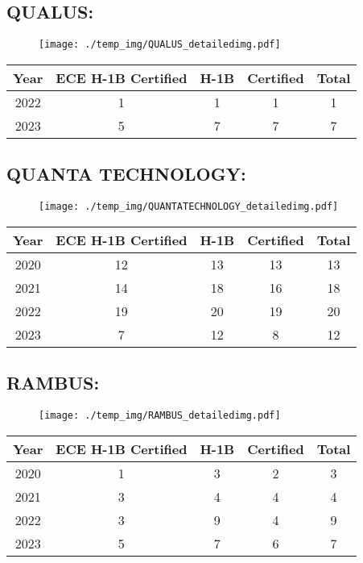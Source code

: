 \documentclass{article}%
\begin{document}
%
\newpage%
\subsection{QUALUS:}%
\label{subsec:QUALUS}%
\label{QUALUSdetailed}%


\begin{figure}[htbp]%
\centering%
\texttt{[image: ./temp\_img/QUALUS\_detailedimg.pdf]}%
\end{figure}

%
\begin{longtable}{c|c|c|c|c}%
\hline%
Year&ECE H{-}1B Certified&H{-}1B&Certified&Total\\%
\hline%
2022&1&1&1&1\\%
\hline%
2023&5&7&7&7\\%
\hline%
\end{longtable}

%
\newpage%
\subsection{QUANTA TECHNOLOGY:}%
\label{subsec:QUANTATECHNOLOGY}%
\label{QUANTATECHNOLOGYdetailed}%


\begin{figure}[htbp]%
\centering%
\texttt{[image: ./temp\_img/QUANTATECHNOLOGY\_detailedimg.pdf]}%
\end{figure}

%
\begin{longtable}{c|c|c|c|c}%
\hline%
Year&ECE H{-}1B Certified&H{-}1B&Certified&Total\\%
\hline%
2020&12&13&13&13\\%
\hline%
2021&14&18&16&18\\%
\hline%
2022&19&20&19&20\\%
\hline%
2023&7&12&8&12\\%
\hline%
\end{longtable}

%
\newpage%
\subsection{RAMBUS:}%
\label{subsec:RAMBUS}%
\label{RAMBUSdetailed}%


\begin{figure}[htbp]%
\centering%
\texttt{[image: ./temp\_img/RAMBUS\_detailedimg.pdf]}%
\end{figure}

%
\begin{longtable}{c|c|c|c|c}%
\hline%
Year&ECE H{-}1B Certified&H{-}1B&Certified&Total\\%
\hline%
2020&1&3&2&3\\%
\hline%
2021&3&4&4&4\\%
\hline%
2022&3&9&4&9\\%
\hline%
2023&5&7&6&7\\%
\hline%
\end{longtable}
\end{document}
